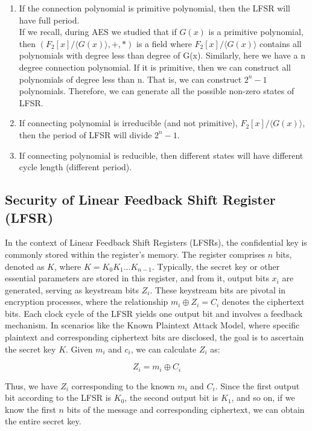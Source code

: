 \documentclass[11pt]{article}
\begin{document}
\begin{enumerate}
    \item If the connection polynomial is primitive polynomial, then the LFSR will have full period.\\
    \newline
    If we recall, during AES we studied that if $G(x)$ is a primitive polynomial, then $(F_2[x]/\langle G(x)\rangle, +, *)$ is a field where $F_2[x]/\langle G(x)\rangle$ contains all polynomials with degree less than degree of G(x). Similarly, here we have a n degree connection polynomial. If it is primitive, then we can construct all polynomials of degree less than n. That is, we can construct $2^n - 1$ polynomials. Therefore, we can generate all the possible non-zero states of LFSR.

    \item If connecting polynomial is irreducible (and not primitive), $F_2[x]/\langle G(x)\rangle$, then the period of LFSR will divide $2^n-1$.

    \item If connecting polynomial is reducible, then different states will have different cycle length (different period).
\end{enumerate}


\subsection*{Security of Linear Feedback Shift Register (LFSR)}

In the context of Linear Feedback Shift Registers (LFSRs), the confidential key is commonly stored within the register's memory. The register comprises \( n \) bits, denoted as \( K \), where \( K = K_0K_1 \ldots K_{n-1} \). Typically, the secret key or other essential parameters are stored in this register, and from it, output bits \( x_i \) are generated, serving as keystream bits \( Z_i \). These keystream bits are pivotal in encryption processes, where the relationship \( m_i \oplus Z_i = C_i \) denotes the ciphertext bits. Each clock cycle of the LFSR yields one output bit and involves a feedback mechanism. In scenarios like the Known Plaintext Attack Model, where specific plaintext and corresponding ciphertext bits are disclosed, the goal is to ascertain the secret key \( K \).
 Given \(m_i\) and \(c_i\), we can calculate \(Z_i\) as:

\[ Z_i = m_i \oplus C_i \]

Thus, we have \(Z_i\) corresponding to the known \(m_i\) and \(C_i\). Since the first output bit according to the LFSR is \(K_0\), the second output bit is \(K_1\), and so on, if we know the first \(n\) bits of the message and corresponding ciphertext, we can obtain the entire secret key.
\end{document}
